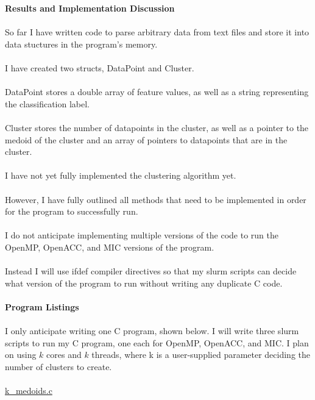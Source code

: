 \documentclass{article}
\begin{document}
\textbf{Results and Implementation Discussion} \\~\\
So far I have written code to parse arbitrary data from text files and store it into data stuctures in the program's memory. \\~\\
I have created two structs, DataPoint and Cluster. \\~\\
DataPoint stores a double array of feature values, as well as a string representing the classification label. \\~\\
Cluster stores the number of datapoints in the cluster, as well as a pointer to the medoid of the cluster and an array of pointers to datapoints that are in the cluster. \\~\\
I have not yet fully implemented the clustering algorithm yet. \\~\\
However, I have fully outlined all methods that need to be implemented in order for the program to successfully run. \\~\\
I do not anticipate implementing multiple versions of the code to run the OpenMP, OpenACC, and MIC versions of the program. \\~\\
Instead I will use ifdef compiler directives so that my slurm scripts can decide what version of the program to run without writing any duplicate C code. \\~\\

\textbf{Program Listings} \\~\\

I only anticipate writing one C program, shown below. I will write three slurm scripts to run my C program, one each for OpenMP, OpenACC, and MIC. 
I plan on using $k$ cores and $k$ threads, where k is a user-supplied parameter deciding the number of clusters to create.\\~\\

\underline{k\_medoids.c} \\~\\



\end{document}
